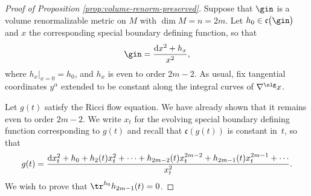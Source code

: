 \begin{proof}[Proof of Proposition \ref{prop:volume-renorm-preserved}] Suppose that $\gin$ is a volume renormalizable metric on $M$ with $\dim M = n = 2m$. Let $h_0 \in \mathfrak c\big(\gin\big)$ and $x$ the corresponding special boundary defining function, so that
\begin{gather*}%
\gin = \frac{{\rm d}x^2 + h_x}{x^2},
\end{gather*}
where $h_x|_{x=0} = h_0$, and $h_x$ is even to order $2m-2$. As usual, fix tangential coordinates $y^{\alpha}$ extended to be constant along the integral curves of $\nabla^{\olg} x$.

Let $g(t)$ satisfy the Ricci flow equation. We have already shown that it remains even to order $2m-2$. We write $x_t$ for the evolving special boundary defining function corresponding to $g(t)$ and recall that $\mathfrak c(g(t))$ is constant in~$t$, so that
\begin{gather*}%
g(t) = \frac{{\rm d}x_t^2 + h_0 + h_2 (t) x_t^2 + \cdots + h_{2m-2}(t) x_t^{2m-2} + h_{2m-1}(t) x_t^{2m-1} + \cdots}{x_t^2} .
\end{gather*}
We wish to prove that $\tr^{h_0} h_{2m-1}(t) = 0$.


\end{proof}
